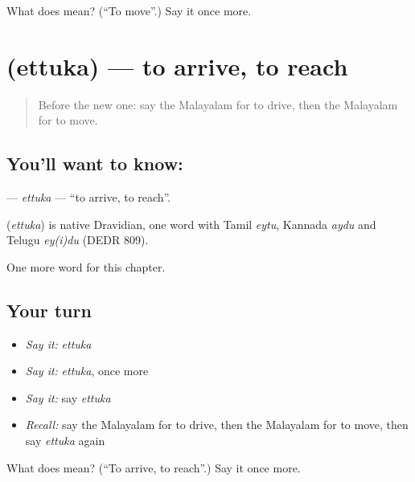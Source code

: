 \begin{tcolorbox}[breakable,colback=teal!4,colframe=teal!35!black,title={Before you move on}]
What does  mean? (\textquotedblleft{}To move\textquotedblright{}.) Say it once more.
\end{tcolorbox}
\section[\texorpdfstring{\ml{എത്തുക} (ettuka)}{എത്തുക (ettuka)}]{ (ettuka) — to arrive, to reach}

\label{lesson:ML-C225-ettuka}



\begin{quote}
Before the new one: say the Malayalam for to drive, then the Malayalam for to move.
\end{quote}

\subsection*{You'll want to know: }
\textbf{} — \emph{ettuka} — \textquotedblleft{}to arrive, to reach\textquotedblright{}.

\begin{cousinweb}
\textbf{} (\emph{ettuka}) is native Dravidian, one word with Tamil \emph{eytu}, Kannada \emph{aydu} and Telugu \emph{ey(i)du} (DEDR 809).
\end{cousinweb}

\begin{grammarlens}[title={What you've built}]
One more word for this chapter.
\end{grammarlens}

\subsection*{Your turn}
\begin{itemize}
\raggedright
  \item \emph{Say it:} \emph{ettuka}
  \item \emph{Say it:} \emph{ettuka}, once more
  \item \emph{Say it:} say \emph{ettuka}
  \item \emph{Recall:} say the Malayalam for to drive, then the Malayalam for to move, then say \emph{ettuka} again
\end{itemize}

\begin{tcolorbox}[breakable,colback=teal!4,colframe=teal!35!black,title={Before you move on}]
What does  mean? (\textquotedblleft{}To arrive, to reach\textquotedblright{}.) Say it once more.
\end{tcolorbox}
